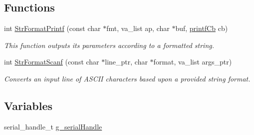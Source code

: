 \subsection*{Functions}
\begin{DoxyCompactItemize}
\item 
int \mbox{\hyperlink{group__debugconsole_ga50b9d66ac2ba38b23b99dac4e81f4b8c}{Str\+Format\+Printf}} (const char $\ast$fmt, va\+\_\+list ap, char $\ast$buf, \mbox{\hyperlink{group__debugconsole_ga85e7bd4e26348dd4b87e4c3a600868c9}{printf\+Cb}} cb)
\begin{DoxyCompactList}\small\item\em This function outputs its parameters according to a formatted string. \end{DoxyCompactList}\item 
int \mbox{\hyperlink{group__debugconsole_gafe318e0fd8d0f6ebad0c8a871a7a196f}{Str\+Format\+Scanf}} (const char $\ast$line\+\_\+ptr, char $\ast$format, va\+\_\+list args\+\_\+ptr)
\begin{DoxyCompactList}\small\item\em Converts an input line of A\+S\+C\+II characters based upon a provided string format. \end{DoxyCompactList}\end{DoxyCompactItemize}
\subsection*{Variables}
\begin{DoxyCompactItemize}
\item 
serial\+\_\+handle\+\_\+t \mbox{\hyperlink{group__debugconsole_gaad3c4240a1364156a239471ccdb9aa0b}{g\+\_\+serial\+Handle}}
\end{DoxyCompactItemize}
